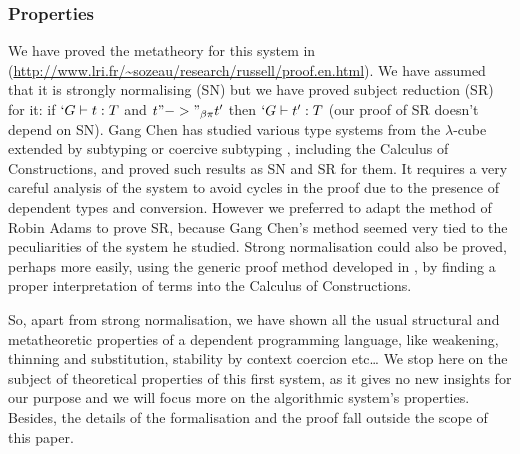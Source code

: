 \documentclass{llncs}
\begin{document}
\subsubsection{Properties}
We have proved the metatheory for this system in \Coq{}
(\url{http://www.lri.fr/~sozeau/research/russell/proof.en.html}).
 We have assumed that it is strongly
normalising (SN) but we have proved subject reduction (SR) for it: 
if $`G \vdash t : T$ and $t "->"_{\beta\pi} t'$ then $`G \vdash t' :
T$ (our proof of SR doesn't depend on SN).
Gang Chen \cite{ChenPhD} has studied various type systems from the
$\lambda$-cube extended by subtyping or coercive subtyping
\cite{DBLP:conf/csl/Luo96}, including the Calculus of Constructions, and
proved such results as SN and SR for them. It requires a very careful
analysis of the system to avoid cycles in the proof due to the presence
of dependent types and conversion. However we preferred to adapt the method of
Robin Adams \cite{adams:PTSEQ} to prove SR, because Gang Chen's method
seemed very tied to the peculiarities of the system he studied. 
Strong normalisation could also be proved, perhaps more easily,
using the generic proof method developed in \cite{geuvers95}, by finding
a proper interpretation of \Russell terms into the Calculus of
Constructions.

So, apart from strong normalisation, we have shown all the usual structural
and metatheoretic properties of a dependent programming language, like
weakening, thinning and substitution, stability by context coercion etc\ldots
We stop here on the subject of theoretical properties of this first system, as
it gives no new insights for our purpose and we will focus more on the
algorithmic system's properties. Besides, the details of the
formalisation and the proof fall outside the scope of this paper.


\end{document}
